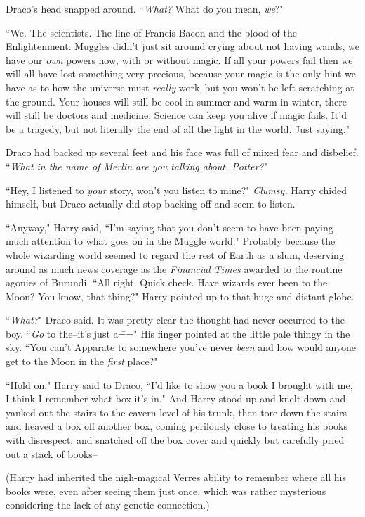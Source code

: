 Draco's head snapped around. ``\emph{What?} What do you mean, \emph{we}?"

``We. The scientists. The line of Francis Bacon and the blood of the Enlightenment. Muggles didn't just sit around crying about not having wands, we have our \emph{own} powers now, with or without magic. If all your powers fail then we will all have lost something very precious, because your magic is the only hint we have as to how the universe must \emph{really} work\---but you won't be left scratching at the ground. Your houses will still be cool in summer and warm in winter, there will still be doctors and medicine. Science can keep you alive if magic fails. It'd be a tragedy, but not literally the end of all the light in the world. Just saying."

Draco had backed up several feet and his face was full of mixed fear and disbelief. ``\emph{What in the name of Merlin are you talking about, Potter?}"

``Hey, I listened to \emph{your} story, won't you listen to mine?" \emph{Clumsy,} Harry chided himself, but Draco actually did stop backing off and seem to listen.

``Anyway," Harry said, ``I'm saying that you don't seem to have been paying much attention to what goes on in the Muggle world." Probably because the whole wizarding world seemed to regard the rest of Earth as a slum, deserving around as much news coverage as the \emph{Financial Times} awarded to the routine agonies of Burundi. ``All right. Quick check. Have wizards ever been to the Moon? You know, that thing?" Harry pointed up to that huge and distant globe.

``\emph{What?}" Draco said. It was pretty clear the thought had never occurred to the boy. ``\emph{Go} to the\---it's just a\===" His finger pointed at the little pale thingy in the sky. ``You can't Apparate to somewhere you've never \emph{been} and how would anyone get to the Moon in the \emph{first} place?"

``Hold on," Harry said to Draco, ``I'd like to show you a book I brought with me, I think I remember what box it's in." And Harry stood up and knelt down and yanked out the stairs to the cavern level of his trunk, then tore down the stairs and heaved a box off another box, coming perilously close to treating his books with disrespect, and snatched off the box cover and quickly but carefully pried out a stack of books\---

(Harry had inherited the nigh-magical Verres ability to remember where all his books were, even after seeing them just once, which was rather mysterious considering the lack of any genetic connection.)

